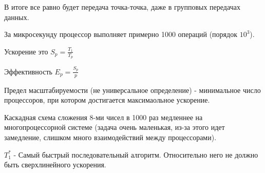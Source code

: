 \documentclass[14pt]{extarticle}
\begin{document}
В итоге все равно будет передача точка-точка, даже в групповых передачах данных.

За микросекунду процессор выполняет примерно 1000 операций (порядок $ 10^3 $). 

Ускорение это $ S_p = \frac{T_1}{T_p}  $

Эффективность $ E_p = \frac{S_p }{p} $

Предел масштабируемости (не универсальное определение) - минимальное число процессоров, при котором достигается максимаольное ускорение.

Каскадная схема сложения 8-ми чисел в 1000 раз медленнее на многопроцессорной системе (задача очень маленькая, из-за этого идет замедление, слишком много взаимодействий между процессорами).

$ T_1^* $ - Самый быстрый последовательный алгоритм. Относительно него не должно быть сверхлинейного ускорения.
\end{document}
